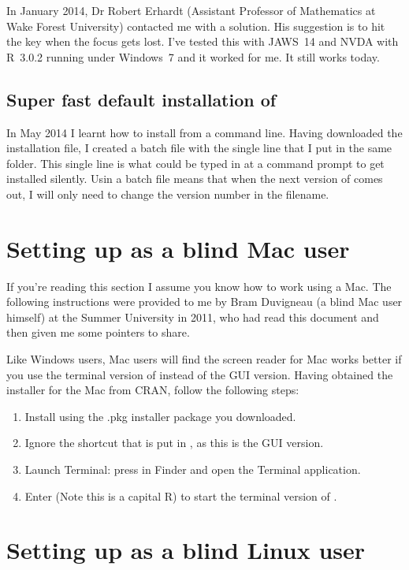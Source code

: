 In January 2014, Dr Robert Erhardt (Assistant Professor of Mathematics at Wake Forest University) contacted me with a solution. His suggestion is to hit the  key when the focus gets lost. I've tested this with  JAWS~14 and NVDA with  R~3.0.2 running under Windows~7 and it worked for me. It still works today. 

\subsection{Super fast default installation of \R{}}

In May 2014 I learnt how to install \R{} from a command line. Having downloaded the installation file, I created a batch file with the single line  that I put in the same folder. This single line is what could be typed in at a command prompt to get \R{} installed silently. Usin a batch file means that when the next version of \R{} comes out, I will only need to change the version number in the filename.



\section{Setting up \R{} as a blind Mac user}

If you're reading this section I assume you know how to work using a Mac. The following instructions were provided to me by Bram Duvigneau%
(a blind Mac user himself) at the Summer University in 2011, who had read this document and then given me some pointers to share. 

Like Windows users, Mac users will find the screen reader for Mac works better if you use the terminal version of \R{} instead of the GUI version. Having obtained the installer for the Mac from CRAN, follow the following steps: \begin{enumerate}
\item Install \R{} using the .pkg installer package you downloaded. 
\item Ignore the shortcut that is put in , as this is the GUI version.
\item Launch Terminal: press  in Finder and open the Terminal application.
\item Enter  (Note this is a capital R) to start the terminal version of \R{}.
\end{enumerate}

\section{Setting up \R{} as a blind Linux user}

